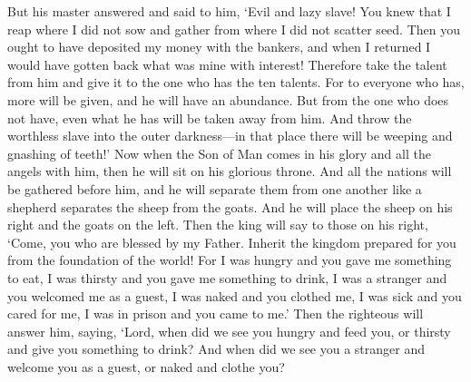 \begin{biblechapter}
\verse But his master answered and said to him, ‘Evil and lazy slave! You knew that I reap where I did not sow and gather from where I did not scatter seed.
\verse Then you ought to have deposited my money with the bankers, and when I returned I would have gotten back what was mine with interest!
\verse Therefore take the talent from him and give it to the one who has the ten talents.
\verse For to everyone who has, more will be given, and he will have an abundance. But from the one who does not have, even what he has will be taken away from him.
\verse And throw the worthless slave into the outer darkness—in that place there will be weeping and gnashing of teeth!’
 Now when the Son of Man comes in his glory and all the angels with him, then he will sit on his glorious throne.
\verse And all the nations will be gathered before him, and he will separate them from one another like a shepherd separates the sheep from the goats.
\verse And he will place the sheep on his right and the goats on the left.
\verse Then the king will say to those on his right, ‘Come, you who are blessed by my Father. Inherit the kingdom prepared for you from the foundation of the world!
\verse For I was hungry and you gave me something to eat, I was thirsty and you gave me something to drink, I was a stranger and you welcomed me as a guest,
\verse I was naked and you clothed me, I was sick and you cared for me, I was in prison and you came to me.’
\verse Then the righteous will answer him, saying, ‘Lord, when did we see you hungry and feed you, or thirsty and give you something to drink?
\verse And when did we see you a stranger and welcome you as a guest, or naked and clothe you?

\end{biblechapter}
